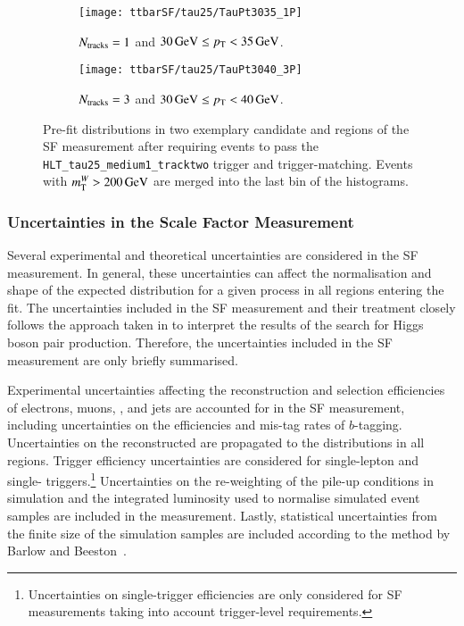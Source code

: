 \begin{figure}[htbp]
  \centering

  \begin{subfigure}{.48\textwidth}
    \texttt{[image: ttbarSF/tau25/TauPt3035\_1P]}
    \caption{$N_{\text{tracks}} = 1$ and $\SI{30}{\ensuremath{\text{GeV}}} \leq p_{\text{T}} < \SI{35}{\ensuremath{\text{GeV}}}$.}
  \end{subfigure}\hfill%
  \begin{subfigure}{.48\textwidth}
    \texttt{[image: ttbarSF/tau25/TauPt3040\_3P]}
    \caption{$N_{\text{tracks}} = 3$ and $\SI{30}{\GeV} \leq \pT < \SI{40}{\GeV}$.}
  \end{subfigure}

  \caption{Pre-fit \mTW distributions in two exemplary \tauhadvis candidate
    \Ntracks and \pT regions of the SF measurement after requiring events to
    pass the \texttt{HLT\_tau25\_medium1\_tracktwo} trigger and
    trigger-matching. Events with $m_{\text{T}}^W > \SI{200}{\ensuremath{\text{GeV}}}$ are merged into the
    last bin of the histograms.}%
  \label{fig:ttbarsf_mtw_examples_prefit}
\end{figure}


\subsubsection{Uncertainties in the Scale Factor Measurement}

Several experimental and theoretical uncertainties are considered in the SF
measurement. In general, these uncertainties can affect the normalisation and
shape of the expected \mTW distribution for a given process in all regions
entering the fit. The uncertainties included in the SF measurement and their
treatment closely follows the approach taken in
 to interpret the results of
the search for Higgs boson pair production. Therefore, the uncertainties
included in the SF measurement are only briefly summarised.

Experimental uncertainties affecting the reconstruction and selection
efficiencies of electrons, muons, \tauhadvis, and jets are accounted for in the
SF measurement, including uncertainties on the efficiencies and mis-tag rates of
$b$-tagging. Uncertainties on the reconstructed \pTmissAbs are propagated to the
\mTW distributions in all regions. Trigger efficiency uncertainties are
considered for single-lepton and single-\tauhadvis
triggers.\footnote{Uncertainties on single-\tauhadvis trigger efficiencies are
  only considered for SF measurements taking into account trigger-level \tauid
  requirements.}  Uncertainties on the re-weighting of the pile-up conditions in
simulation and the integrated luminosity used to normalise simulated event
samples are included in the measurement. Lastly, statistical uncertainties from
the finite size of the simulation samples are included according to the method
by Barlow and Beeston~\cite{barlow1993,conway2011}.

